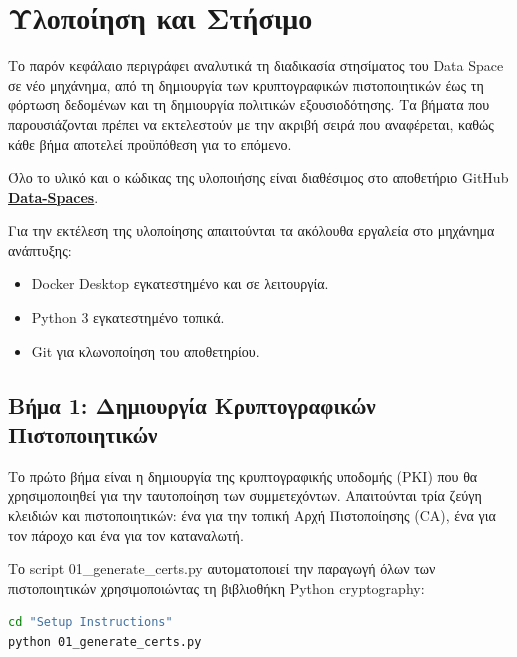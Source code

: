 \chapter{Υλοποίηση και Στήσιμο}
\label{ch:implementation}


Το παρόν κεφάλαιο περιγράφει αναλυτικά τη διαδικασία στησίματος του
\textlatin{Data Space} σε νέο μηχάνημα, από τη δημιουργία των
κρυπτογραφικών πιστοποιητικών έως τη φόρτωση δεδομένων και τη δημιουργία
πολιτικών εξουσιοδότησης. Τα βήματα που παρουσιάζονται πρέπει να
εκτελεστούν με την ακριβή σειρά που αναφέρεται, καθώς κάθε βήμα αποτελεί
προϋπόθεση για το επόμενο.

Όλο το υλικό και ο κώδικας της υλοποιήσης είναι διαθέσιμος στο αποθετήριο
\textlatin{GitHub} \href{https://github.com/sakakos/Data-Spaces}{\textbf{\textlatin{Data-Spaces}}}.

Για την εκτέλεση της υλοποίησης απαιτούνται τα ακόλουθα εργαλεία στο
μηχάνημα ανάπτυξης:

\begin{itemize}
    \item \textlatin{Docker Desktop} εγκατεστημένο και σε λειτουργία.
    \item \textlatin{Python 3} εγκατεστημένο τοπικά.
    \item \textlatin{Git} για κλωνοποίηση του αποθετηρίου.
\end{itemize}

\section{Βήμα 1: Δημιουργία Κρυπτογραφικών Πιστοποιητικών}
\label{sec:step1-certs}

Το πρώτο βήμα είναι η δημιουργία της κρυπτογραφικής υποδομής
(\textlatin{PKI}) που θα χρησιμοποιηθεί για την ταυτοποίηση των
συμμετεχόντων. Απαιτούνται τρία ζεύγη κλειδιών και πιστοποιητικών:
ένα για την τοπική Αρχή Πιστοποίησης (\textlatin{CA}), ένα για τον
πάροχο και ένα για τον καταναλωτή.

Το \textlatin{script} \textlatin{01\_generate\_certs.py} αυτοματοποιεί
την παραγωγή όλων των πιστοποιητικών χρησιμοποιώντας τη βιβλιοθήκη
\textlatin{Python} \textlatin{cryptography}:
\vspace{0.2cm}

\begin{lstlisting}[language=bash, caption={Certificate generation script execution.}, stringstyle=\color{black}, keywordstyle=\color{black}]
cd "Setup Instructions"
python 01_generate_certs.py
\end{lstlisting}

